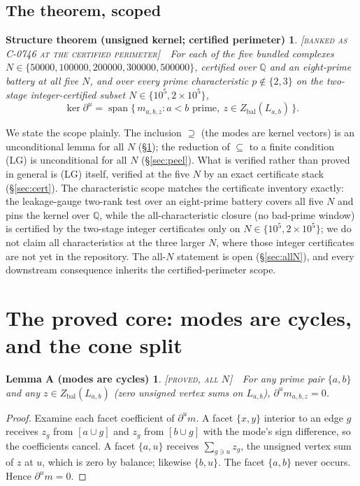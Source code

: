 \documentclass[11pt,reqno]{amsart}
\theoremstyle{plain}
\theoremstyle{definition}
\theoremstyle{plain}
\newtheorem*{structthm}{Structure theorem (unsigned kernel; certified perimeter)}
\newtheorem*{lemA}{Lemma A (modes are cycles)}
\theoremstyle{definition}
\newcommand{\Q}{\mathbb{Q}}
\newcommand{\Zbal}{Z_{\mathrm{bal}}}
\newcommand{\dbu}{\partial^{u}}
\newcommand{\st}{\textsc}
\begin{document}
\subsection{The theorem, scoped}
\begin{structthm}
\textnormal{\st{[banked as C-0746 at the certified perimeter]}}\ \ For each of the five bundled
complexes $N\in\{50000,100000,200000,300000,500000\}$, certified over $\Q$ and an eight-prime
battery at all five $N$, and over every prime characteristic $p\notin\{2,3\}$ on the two-stage
integer-certified subset $N\in\{10^5,2\times10^5\}$,
\[
\ker\dbu=\operatorname{span}\{\,m_{a,b,z}: a<b\text{ prime},\ z\in\Zbal(L_{a,b})\,\}.
\]
\end{structthm}
\noindent We state the scope plainly. The inclusion $\supseteq$ (the modes are kernel vectors)
is an unconditional lemma for all $N$ (\S\ref{sec:core}); the reduction of $\subseteq$ to a
finite condition (LG) is unconditional for all $N$ (\S\ref{sec:peel}). What is verified rather
than proved in general is (LG) itself, verified at the five $N$ by an exact certificate stack
(\S\ref{sec:cert}). The characteristic scope matches the certificate inventory exactly: the
leakage-gauge two-rank test over an eight-prime battery covers all five $N$ and pins the kernel
over $\Q$, while the all-characteristic closure (no bad-prime window) is certified by the
two-stage integer certificates only on $N\in\{10^5,2\times10^5\}$; we do not claim all
characteristics at the three larger $N$, where those integer certificates are not yet in the
repository. The all-$N$ statement is open (\S\ref{sec:allN}), and every downstream consequence
inherits the certified-perimeter scope.

\section{The proved core: modes are cycles, and the cone split}\label{sec:core}

\begin{lemA}
\textnormal{\st{[proved, all $N$]}}\ \ For any prime pair $\{a,b\}$ and any
$z\in\Zbal(L_{a,b})$ (zero unsigned vertex sums on $L_{a,b}$), $\dbu m_{a,b,z}=0$.
\end{lemA}
\begin{proof}
Examine each facet coefficient of $\dbu m$. A facet $\{x,y\}$ interior to an edge $g$ receives
$z_g$ from $[a\cup g]$ and $z_g$ from $[b\cup g]$ with the mode's sign difference, so the
coefficients cancel. A facet $\{a,u\}$ receives $\sum_{g\ni u}z_g$, the unsigned vertex sum of
$z$ at $u$, which is zero by balance; likewise $\{b,u\}$. The facet $\{a,b\}$ never occurs.
Hence $\dbu m=0$.
\end{proof}
\end{document}
